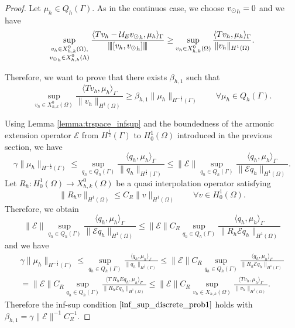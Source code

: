 \begin{proof}
Let $\mu_h \in Q_h(\Gamma)$. As in the continuos case, we choose ${v_{\odot}}_h =0$ and we have
\begin{equation*}
\sup_{\substack{v_h \in X^0_{h,k}(\Omega),\\ {v_{\odot}}_h \in X^0_{h,k}(\Lambda)}} \frac{ \langle T v_h - \mathcal{U}_E {v_{\odot}}_h, \mu_h \rangle _{\Gamma}} {{\left\vert\kern-0.25ex\left\vert\kern-0.25ex\left\vert [v_h,  {v_{\odot}}_h] \right\vert\kern-0.25ex\right\vert\kern-0.25ex\right\vert}}
\geq \sup_{v_h \in X^0_{h,k}(\Omega)} \frac{ \langle T v_h, \mu_h \rangle _{\Gamma} } {\|v_h\|_{H^1(\Omega)}}.
\end{equation*}

Therefore, we want to prove that there exists $\beta_{h,1}$ such that
\begin{equation*}
\sup_{v_h \in X^0_{h,k}(\Omega)} \frac{ \langle T v_h, \mu_h \rangle _{\Gamma} } {\|v_h\|_{H^1(\Omega)}} \geq \beta_{h,1} \|\mu_h\|_{H^{-\frac 12}(\Gamma)} \qquad \forall \mu_h \in Q_h(\Gamma).
\end{equation*}

Using Lemma \ref{lemma:trspace_infsup} and the boundedness of the armonic extension operator $\mathcal{E}$ from $H^{\frac 12}(\Gamma)$ to $H^1_0(\Omega)$ introduced in the previous section, we have
\begin{equation*}
\gamma \|\mu_h\|_{H^{-\frac 12}(\Gamma)} \leq  \sup_{q_h \in Q_h(\Gamma)} \frac{ \langle q_h, \mu_h \rangle _{\Gamma} } {\|q_h\|_{H^{\frac 12}(\Gamma)}} 
\leq 
\|\mathcal{E}\| \sup_{q_h \in Q_h(\Gamma)} \frac{ \langle q_h, \mu_h \rangle _{\Gamma} } {\|\mathcal{E}q_h\|_{H^1(\Omega)}} .
\end{equation*}
Let $R_h: H^1_0(\Omega) \rightarrow X_{h,k}^0(\Omega)$ be a quasi interpolation operator satisfying 
\begin{equation*}
\|R_h v\|_{H^1(\Omega)} \leq C_R \|v\|_{H^1(\Omega)} \qquad \forall v \in H^1_0(\Omega).
\end{equation*}
Therefore, we obtain 
\begin{equation*}
\|\mathcal{E}\| \sup_{q_h \in Q_h(\Gamma)} \frac{ \langle q_h, \mu_h \rangle _{\Gamma} } {\|\mathcal{E}q_h\|_{H^1(\Omega)}} 
\leq
\|\mathcal{E}\| C_R \sup_{q_h \in Q_h(\Gamma)} \frac{ \langle q_h, \mu_h \rangle _{\Gamma} } {\|R_h \mathcal{E} q_h\|_{H^1(\Omega)}}
\end{equation*}
and we have
\begin{multline}
\gamma \|\mu_h\|_{H^{-\frac 12}(\Gamma)} 
\leq 
\sup_{q_h \in Q_h(\Gamma)} \frac{ \langle q_h, \mu_h \rangle_{\Gamma} } {\|q_h\|_{H^{\frac 12}(\Gamma)}} 
\leq
\|\mathcal{E}\| C_R \sup_{q_h \in Q_h(\Gamma)} \frac{ \langle q_h, \mu_h \rangle_{\Gamma} } {\|R_h \mathcal{E} q_h\|_{H^1(\Gamma)}}
\\
=
\|\mathcal{E}\| C_R \sup_{q_h \in Q_h(\Gamma)} \frac{ \langle T \ R_h E q_h, \mu_h \rangle_{\Gamma} } {\|R_h \mathcal{E} q_h\|_{H^1(\Omega)}} 
\leq \|\mathcal{E}\| C_R \sup_{v_h \in X_{h,k}(\Omega)} \frac{ \langle T v_h, \mu_h \rangle_{\Gamma} } {\|v_h\|_{H^1(\Omega)}}. 
\end{multline}
Therefore the inf-sup condition $\eqref{inf_sup_discrete_prob1}$ holds with $\beta_{h,1} = \gamma \|\mathcal{E}\|^{-1} C_R^{-1} $.
\end{proof}
